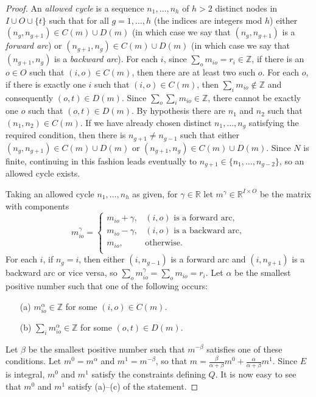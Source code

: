 \documentclass[12pt]{article}
\theoremstyle{definition}
\renewcommand{\Re}{\mathbb{R}}
\newcommand{\In}{\mathbb{Z}}
\begin{document}
\begin{proof}
  An \emph{allowed cycle} is a sequence $n_1, \ldots, n_h$ of $h > 2$ distinct nodes in $I \cup O \cup \{t\}$ such that for all $g = 1, \ldots, h$ (the indices are integers mod $h$) either $(n_g,n_{g+1}) \in C(m) \cup D(m)$ (in which case we say that $(n_g,n_{g+1})$ is a \emph{forward arc}) or $(n_{g+1},n_g) \in C(m) \cup D(m)$ (in which case we say that $(n_{g+1},n_g)$ is a \emph{backward arc}).  For each $i$, since $\sum_o m_{io} = r_i \in \In$, if there is an $o \in O$ such that $(i,o) \in C(m)$, then there are at least two such $o$.  For each $o$, if there is exactly one $i$ such that $(i,o) \in C(m)$, then $\sum_i m_{io} \notin \In$ and consequently $(o,t) \in D(m)$.  Since $\sum_o \sum_i m_{io} \in \In$, there cannot be exactly one $o$ such that $(o,t) \in D(m)$.  By hypothesis there are $n_1$ and $n_2$ such that $(n_1,n_2) \in C(m)$.  If we have already chosen distinct $n_1, \ldots, n_g$ satisfying the required condition, then there is $n_{g+1} \ne n_{g-1}$ such that either $(n_g,n_{g+1}) \in C(m) \cup D(m)$ or $(n_{g+1},n_g) \in C(m) \cup D(m)$.  Since $N$ is finite, continuing in this fashion leads eventually to $n_{g+1} \in \{n_1,\ldots,n_{g-2}\}$, so an allowed cycle exists.

  Taking an allowed cycle $n_1, \ldots, n_h$ as given, for $\gamma \in \Re$ let $m^\gamma \in \Re^{I \times O}$ be the matrix with components
  $$m_{io}^\gamma = \begin{cases}
  m_{io} + \gamma, & \text{$(i,o)$ is a forward arc}, \\
  m_{io} - \gamma, & \text{$(i,o)$ is a backward arc}, \\
  m_{io}, & \text{otherwise}. \\
  \end{cases}$$
  For each $i$, if $n_g = i$, then either $(i,n_{g-1})$ is a forward arc and $(i,n_{g+1})$ is a backward arc or vice versa, so $\sum_o m_{io}^\gamma = \sum_o m_{io} = r_i$.  
  Let $\alpha$ be the smallest positive number such that one of the following occurs:
  \begin{enumerate}
    \item[(a)] $m^\alpha_{io} \in \In$ for some $(i,o) \in C(m)$.
    \item[(b)] $\sum_i  m^\alpha_{io} \in \In$ for some $(o,t) \in D(m)$.  
  \end{enumerate}
  Let $\beta$ be the smallest positive number such that $m^{-\beta}$ satisfies one of these conditions.   Let $m^0 = m^\alpha$ and $m^1 = m^{-\beta}$, so that  $m = \tfrac{\beta}{\alpha + \beta}m^0 + \tfrac{\alpha}{\alpha + \beta}m^1$.  Since $E$ is integral, $m^0$ and $m^1$ satisfy the constraints defining $Q$.  It is now easy to see that $m^0$ and $m^1$ satisfy (a)--(c) of the statement.
\end{proof}  
\end{document}
